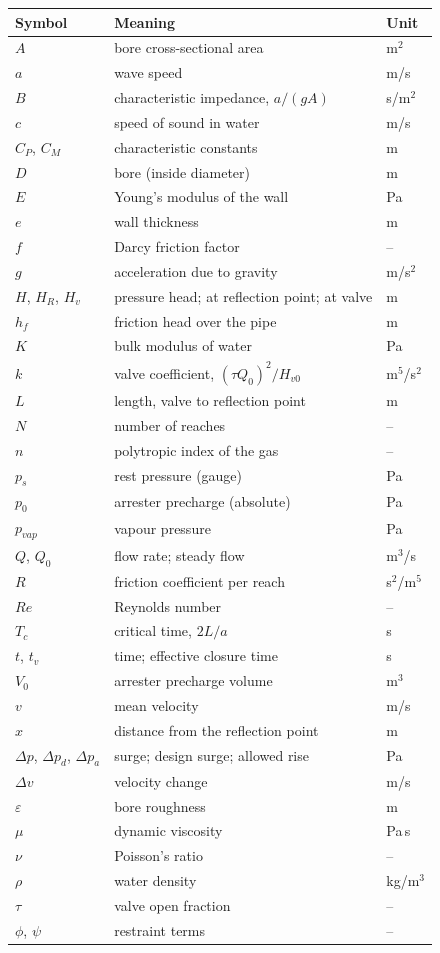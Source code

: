 \documentclass[a4paper,justified,nobib]{tufte-handout}
\begin{document}
{\footnotesize
\begin{tabular}{@{}lll@{}}
\toprule
Symbol & Meaning & Unit \\
\midrule
$A$ & bore cross-sectional area & m$^2$ \\
$a$ & wave speed & m/s \\
$B$ & characteristic impedance, $a/(gA)$ & s/m$^2$ \\
$c$ & speed of sound in water & m/s \\
$C_P$, $C_M$ & characteristic constants & m \\
$D$ & bore (inside diameter) & m \\
$E$ & Young's modulus of the wall & Pa \\
$e$ & wall thickness & m \\
$f$ & Darcy friction factor & -- \\
$g$ & acceleration due to gravity & m/s$^2$ \\
$H$, $H_R$, $H_v$ & pressure head; at reflection point; at valve & m \\
$h_f$ & friction head over the pipe & m \\
$K$ & bulk modulus of water & Pa \\
$k$ & valve coefficient, $(\tau Q_0)^2/H_{v0}$ & m$^5$/s$^2$ \\
$L$ & length, valve to reflection point & m \\
$N$ & number of reaches & -- \\
$n$ & polytropic index of the gas & -- \\
$p_s$ & rest pressure (gauge) & Pa \\
$p_0$ & arrester precharge (absolute) & Pa \\
$p_{vap}$ & vapour pressure & Pa \\
$Q$, $Q_0$ & flow rate; steady flow & m$^3$/s \\
$R$ & friction coefficient per reach & s$^2$/m$^5$ \\
$Re$ & Reynolds number & -- \\
$T_c$ & critical time, $2L/a$ & s \\
$t$, $t_v$ & time; effective closure time & s \\
$V_0$ & arrester precharge volume & m$^3$ \\
$v$ & mean velocity & m/s \\
$x$ & distance from the reflection point & m \\
$\Delta p$, $\Delta p_d$, $\Delta p_a$ & surge; design surge; allowed rise & Pa \\
$\Delta v$ & velocity change & m/s \\
$\varepsilon$ & bore roughness & m \\
$\mu$ & dynamic viscosity & Pa\,s \\
$\nu$ & Poisson's ratio & -- \\
$\rho$ & water density & kg/m$^3$ \\
$\tau$ & valve open fraction & -- \\
$\phi$, $\psi$ & restraint terms & -- \\
\bottomrule
\end{tabular}
}
\end{document}
